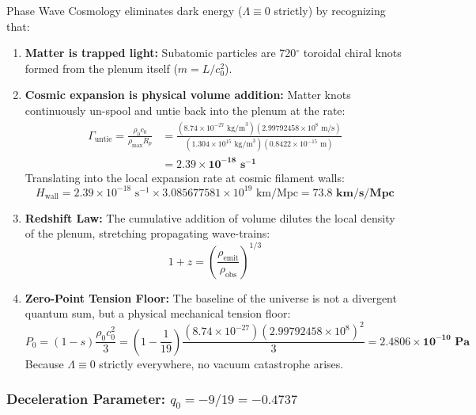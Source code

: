 \documentclass[11pt,a4paper]{article}
\begin{document}
Phase Wave Cosmology eliminates dark energy ($\Lambda \equiv 0$ strictly) by recognizing that:
\begin{enumerate}
    \item \textbf{Matter is trapped light:} Subatomic particles are 720$^\circ$ toroidal chiral knots formed from the plenum itself ($m = L/c_0^2$).
    \item \textbf{Cosmic expansion is physical volume addition:} Matter knots continuously un-spool and untie back into the plenum at the rate:
    \begin{equation}
    \begin{aligned} \Gamma_{\text{untie}} = \frac{\rho_0 c_0}{\rho_{\max} R_p} &= \frac{(8.74 \times 10^{-27}\text{ kg/m}^3)(2.99792458 \times 10^8\text{ m/s})}{(1.304 \times 10^{15}\text{ kg/m}^3)(0.8422 \times 10^{-15}\text{ m})} \\ &= \mathbf{2.39 \times 10^{-18}\text{ s}^{-1}} \end{aligned}
    \end{equation}
    Translating into the local expansion rate at cosmic filament walls:
    \begin{equation}
    H_{\text{wall}} = 2.39 \times 10^{-18}\text{ s}^{-1} \times 3.085677581 \times 10^{19}\text{ km/Mpc} = \mathbf{73.8\text{ km/s/Mpc}}
    \end{equation}
    \item \textbf{Redshift Law:} The cumulative addition of volume dilutes the local density of the plenum, stretching propagating wave-trains:
    \begin{equation}
    1 + z = \left(\frac{\rho_{\text{emit}}}{\rho_{\text{obs}}}\right)^{1/3}
    \end{equation}
    \item \textbf{Zero-Point Tension Floor:} The baseline of the universe is not a divergent quantum sum, but a physical mechanical tension floor:
    \begin{equation}
    P_0 = (1 - s)\frac{\rho_0 c_0^2}{3} = \left(1 - \frac{1}{19}\right) \frac{(8.74 \times 10^{-27})(2.99792458 \times 10^8)^2}{3} = \mathbf{2.4806 \times 10^{-10}\text{ Pa}}
    \end{equation}
    Because $\Lambda \equiv 0$ strictly everywhere, no vacuum catastrophe arises.
\end{enumerate}

\subsubsection{Deceleration Parameter: $q_0 = -9/19 = -0.4737$}
\label{subsubsec:q0_receipt}
\end{document}
